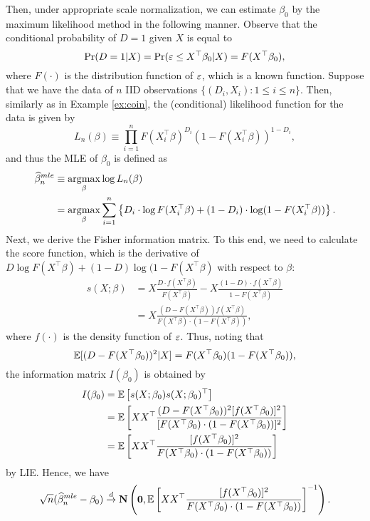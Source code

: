 \documentclass[11pt, A4paper, openany, uplatex]{book}
\begin{document}
Then, under appropriate scale normalization, we can estimate $\beta_0$ by the maximum likelihood method in the following manner.
Observe that the conditional probability of $D = 1$ given $X$ is equal to
\[
	\Pr(D = 1 | X) = \Pr( \varepsilon \le X^\top\beta_0 | X) = F(X^\top\beta_0),
\]
where $F(\cdot)$ is the distribution function of $\varepsilon$, which is a known function.
Suppose that we have the data of $n$ IID observations $\{(D_i, X_i): 1 \le i \le n\}$.
Then, similarly as in Example \ref{ex:coin}, the (conditional) likelihood function for the data is given by
\[
	L_n(\beta) \equiv \prod_{i=1}^n F(X_i^\top\beta)^{D_i} (1 -  F(X_i^\top\beta))^{1 - D_i},
\] 
and thus the MLE of $\beta_0$ is defined as
\begin{align*}
	\widehat \beta_n^{mle} 
	& \equiv \operatorname*{\arg\!\max}_\beta \log L_n(\beta) \\
	& = \operatorname*{\arg\!\max}_\beta \sum_{i =1}^n\left\{ D_i \cdot \log F(X_i^\top \beta) + (1 - D_i) \cdot \log(1 -  F(X_i^\top\beta)) \right\}.
\end{align*}
Next, we derive the Fisher information matrix.
To this end, we need to calculate the score function, which is the derivative of  $D \log F(X^\top \beta) + (1 - D) \log(1 -  F(X^\top\beta)$ with respect to $\beta$:
\begin{align*}
	s(X; \beta) 
	& = X \frac{D \cdot f(X^\top \beta)}{F(X^\top \beta)} - X \frac{(1 - D) \cdot f(X^\top \beta)}{1 - F(X^\top \beta)}\\
	& = X \frac{(D - F(X^\top \beta))f(X^\top \beta)}{F(X^\top \beta) \cdot (1 -  F(X^\top\beta)) },
\end{align*}
where $f(\cdot)$ is the density function of $\varepsilon$.
Thus, noting that 
\[
	\mathbb{E}[(D - F(X^\top\beta_0))^2|X] = F(X^\top \beta_0) (1 - F(X^\top \beta_0)),
\]
the information matrix $I(\beta_0)$ is obtained by
\begin{align*}
	I(\beta_0)
	& = \mathbb{E}\left[ s(X; \beta_0) s(X; \beta_0)^\top \right] \\ 
	& = \mathbb{E}\left[ XX^\top  \frac{(D - F(X^\top \beta_0))^2 [f(X^\top \beta_0)]^2}{[F(X^\top \beta_0) \cdot (1 -  F(X^\top\beta_0))]^2 }\right] \\
	& = \mathbb{E}\left[ XX^\top  \frac{[f(X^\top \beta_0)]^2}{F(X^\top \beta_0) \cdot (1 -  F(X^\top\beta_0)) }\right] 
\end{align*}
by LIE.
Hence, we have
\[
	\sqrt{n}(\widehat \beta_n^{mle} - \beta_0) \overset{d}{\to} \mathbf{N}\left( \mathbf{0}, \mathbb{E}\left[ XX^\top  \frac{[f(X^\top \beta_0)]^2}{F(X^\top \beta_0) \cdot (1 -  F(X^\top\beta_0)) }\right]^{-1}  \right).
\]
\end{document}
